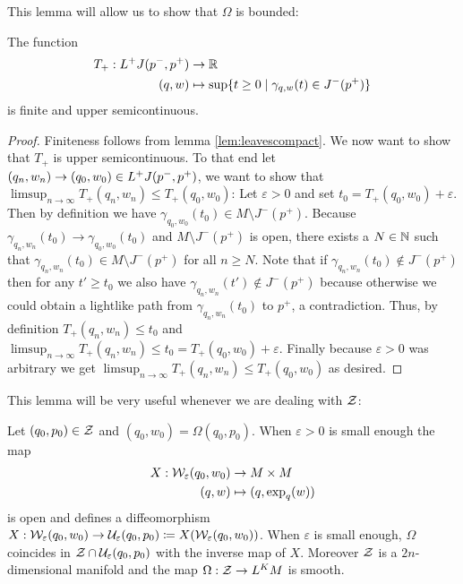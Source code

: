 This lemma will allow us to show that $\Omega$ is bounded:
\begin{lemma}\label{lem:Tprop}The function
    \begin{align*}
        T_+:L^+J(p^-,p^+)&\to \mathbb{R} \\
        (q,w)&\mapsto \sup \{ t\ge 0 \mid \gamma_{q,w}(t)\in J^-(p^+)\}
    \end{align*}
    is finite and upper semicontinuous.
\end{lemma}
\begin{proof}
    Finiteness follows from lemma \ref{lem:leavescompact}. We now want to show that $T_+$ is upper semicontinuous. To that end let $(q_n,w_n)\to (q_0,w_0)\in L^+J(p^-,p^+)$, we want to show that $\limsup_{n\to \infty} T_+(q_n,w_n) \leq T_+(q_0,w_0)$: Let $\varepsilon>0$ and set $t_0 = T_+(q_0,w_0)+\varepsilon$. Then by definition we have $\gamma_{q_0,w_0}(t_0)\in M \setminus J^-(p^+)$. Because $\gamma_{q_n,w_n}(t_0) \to \gamma_{q_0,w_0}(t_0)$ and $M \setminus J^-(p^+)$ is open, there exists a $N\in \mathbb{N}$ such that $\gamma_{q_n,w_n}(t_0)\in M \setminus J^-(p^+)$ for all $n\ge N$. Note that if $\gamma_{q_n,w_n}(t_0)\notin J^-(p^+)$ then for any $t'\ge t_0$ we also have $\gamma_{q_n,w_n}(t') \notin J^-(p^+)$ because otherwise we could obtain a lightlike path from $\gamma_{q_n,w_n}(t_0)$ to $p^+$, a contradiction. Thus, by definition $T_+(q_n,w_n)\leq t_0$ and 
    $\limsup_{n\to \infty} T_+(q_n,w_n) \leq t_0 = T_+(q_0,w_0)+\varepsilon$. Finally because $\varepsilon>0$ was arbitrary we get $\limsup_{n\to \infty} T_+(q_n,w_n) \leq T_+(q_0,w_0)$ as desired.
\end{proof}

This lemma will be very useful whenever we are dealing with ${\mathcal{Z}}$:
\begin{lemma}\label{lem:omegacoords}
Let $(q_0,p_0)\in {\mathcal{Z}}$ and $(q_0,w_0)=\Omega(q_0,p_0)$. When $\varepsilon>0$ is small enough the map 
\begin{align*}
    X:{\mathcal{W}}_\varepsilon(q_0,w_0) &\to M\times M\\
    (q,w) &\mapsto (q,\exp_q(w))
\end{align*}
is open and defines a diffeomorphism $X:{\mathcal{W}}_\varepsilon(q_0,w_0)\to \mathcal{U}_\varepsilon(q_0,p_0) \coloneqq X({\mathcal{W}}_\varepsilon(q_0,w_0))$. When $\varepsilon$ is small enough, $\Omega$ coincides in ${\mathcal{Z}}\cap \mathcal{U}_\varepsilon(q_0,p_0)$ with the inverse map of $X$. Moreover ${\mathcal{Z}}$ is a $2n$-dimensional manifold and the map $\Omega:{\mathcal{Z}}\to L^KM$ is smooth.
\end{lemma}

